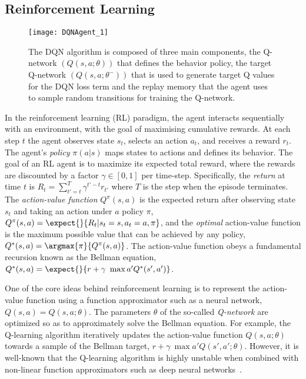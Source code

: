 \subsection{Reinforcement Learning}

\begin{figure}[ht]
    \begin{center}
        \centerline{\texttt{[image: DQNAgent\_1]}}
        \caption{The DQN algorithm is composed of three main components, the Q-network $(Q(s,a;\theta))$ that defines the behavior policy, the target Q-network $(Q(s,a;\theta^-))$ that is used to generate target Q values for the DQN loss term and the replay memory that the agent uses to sample random transitions for training the Q-network.}
        \label{DQN-figure}
    \end{center}
    \vskip -0.2in
\end{figure}

In the reinforcement learning (RL) paradigm, the agent interacts sequentially with an environment, with the goal of maximising cumulative rewards. At each step $t$ the agent observes state $s_t$, selects an action $a_t$, and receives a reward $r_t$. The agent's \emph{policy} $\pi(a | s)$ maps states to actions and defines its behavior. The goal of an RL agent is to maximize its expected total reward, where the rewards are discounted by a factor $\gamma \in [0,1]$ per time-step. Specifically, the \emph{return} at time $t$ is $R_t =\sum\limits_{t'=t}^{T} \gamma^{t'-t}r_{t'}$  where $T$ is the step when the episode terminates. The \emph{action-value function} $Q^\pi(s,a)$ is the expected return after observing state $s_t$ and taking an action under $a$ policy $\pi$, $Q^\pi(s,a) = \expect{}{R_t | s_t=s, a_t=a, \pi}$, and the \emph{optimal} action-value function is the maximum possible value that can be achieved by any policy, $Q^*(s,a) = \argmax{\pi}{Q^\pi(s,a)}$. The action-value function obeys a fundamental recursion known as the Bellman equation, $Q^*(s,a) = \expect{}{r + \gamma \ \max{a'}{Q^*(s',a')}}$. 

One of the core ideas behind reinforcement learning is to represent the action-value function using a function approximator such as a neural network, $Q(s,a) = Q(s,a; \theta)$. The parameters $\theta$ of the so-called \emph{Q-network} are optimized so as to approximately solve the Bellman equation. For example, the Q-learning algorithm iteratively updates the action-value function $Q(s,a; \theta)$ towards a sample of the Bellman target, $r + \gamma \ \max{a'}{Q(s',a'; \theta)}$. However, it is well-known that the Q-learning algorithm is highly unstable when combined with non-linear function approximators such as deep neural networks~\cite{tsitsiklis-convergence}. 

